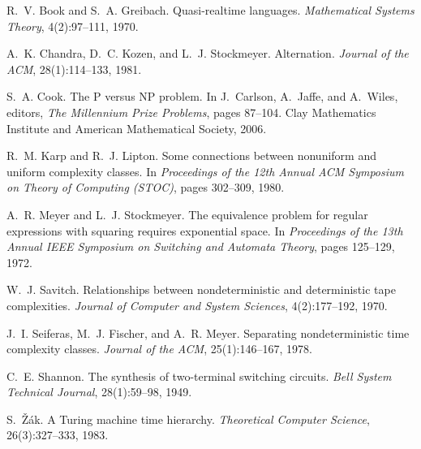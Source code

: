 
R.~V. Book and S.~A. Greibach.
\newblock Quasi-realtime languages.
\newblock \emph{Mathematical Systems Theory}, 4(2):97--111, 1970.

A.~K. Chandra, D.~C. Kozen, and L.~J. Stockmeyer.
\newblock Alternation.
\newblock \emph{Journal of the ACM}, 28(1):114--133, 1981.

S.~A. Cook.
\newblock The P versus NP problem.
\newblock In J.~Carlson, A.~Jaffe, and A.~Wiles, editors, \emph{The Millennium Prize Problems},
pages 87--104. Clay Mathematics Institute and American Mathematical Society, 2006.

R.~M. Karp and R.~J. Lipton.
\newblock Some connections between nonuniform and uniform complexity classes.
\newblock In \emph{Proceedings of the 12th Annual ACM Symposium on Theory of Computing (STOC)},
pages 302--309, 1980.

A.~R. Meyer and L.~J. Stockmeyer.
\newblock The equivalence problem for regular expressions with squaring requires exponential space.
\newblock In \emph{Proceedings of the 13th Annual IEEE Symposium on Switching and Automata Theory},
pages 125--129, 1972.

W.~J. Savitch.
\newblock Relationships between nondeterministic and deterministic tape complexities.
\newblock \emph{Journal of Computer and System Sciences}, 4(2):177--192, 1970.

J.~I. Seiferas, M.~J. Fischer, and A.~R. Meyer.
\newblock Separating nondeterministic time complexity classes.
\newblock \emph{Journal of the ACM}, 25(1):146--167, 1978.

C.~E. Shannon.
\newblock The synthesis of two-terminal switching circuits.
\newblock \emph{Bell System Technical Journal}, 28(1):59--98, 1949.

S.~\v{Z}\'ak.
\newblock A Turing machine time hierarchy.
\newblock \emph{Theoretical Computer Science}, 26(3):327--333, 1983.
